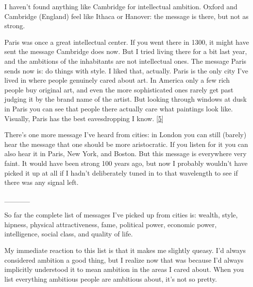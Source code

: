 I
                  haven't found anything like Cambridge for intellectual
                  ambition. Oxford and Cambridge (England) feel like Ithaca or
                  Hanover: the message is there, but not as strong.

Paris
                  was once a great intellectual center. If you went there in
                  1300, it might have sent the message Cambridge does now. But I
                  tried living there for a bit last year, and the ambitions of
                  the inhabitants are not intellectual ones. The message Paris
                  sends now is: do things with style. I liked that, actually.
                  Paris is the only city I've lived in where people genuinely
                  cared about art. In America only a few rich people buy
                  original art, and even the more sophisticated ones rarely get
                  past judging it by the brand name of the artist. But looking
                  through windows at dusk in Paris you can see that people there
                  actually care what paintings look like. Visually, Paris has
                  the best eavesdropping I know.
                  [\href{\#f5n}{5}]

There's one more message I've heard from cities:
                  in London you can still (barely) hear the message that one
                  should be more aristocratic. If you listen for it you can also
                  hear it in Paris, New York, and Boston. But this message is
                  everywhere very faint. It would have been strong 100 years
                  ago, but now I probably wouldn't have picked it up at all if I
                  hadn't deliberately tuned in to that wavelength to see if
                  there was any signal left.


                  \_\_\_\_\_
                  

So far the complete list of messages I've picked
                  up from cities is: wealth, style, hipness, physical
                  attractiveness, fame, political power, economic power,
                  intelligence, social class, and quality of life.

My
                  immediate reaction to this list is that it makes me slightly
                  queasy. I'd always considered ambition a good thing, but I
                  realize now that was because I'd always implicitly understood
                  it to mean ambition in the areas I cared about. When you list
                  everything ambitious people are ambitious about, it's not so
                  pretty.

